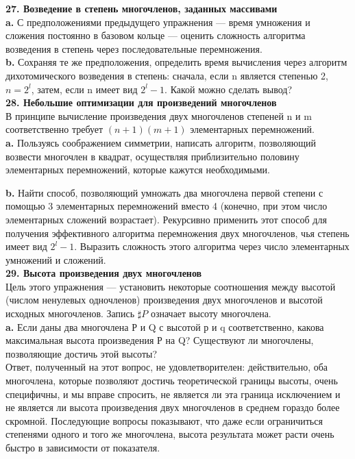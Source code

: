 \noindent
\textbf{27. Возведение в степень многочленов, заданных массивами}\\

\textbf{a.} С предположениями предыдущего упражнения — время умножения и сложения постоянно в базовом кольце — оценить сложность алгоритма возведения в степень через последовательные перемножения.\\

\textbf{b.} Сохраняя те же предположения, определить время вычисления через алгоритм дихотомического возведения в степень: сначала, если n является степенью 2, $n = 2^{l}$, затем, если n имеет вид $2^{l} - 1$. Какой можно сделать вывод?\\

\noindent
\textbf{28. Небольшие оптимизации для произведений многочленов}\\

В принципе вычисление произведения двух многочленов степеней n и m соответственно требует $(n+1)(m+1)$ элементарных перемножений.\\

\textbf{a.} Пользуясь соображением симметрии, написать алгоритм, позволяющий возвести многочлен в квадрат, осуществляя приблизительно половину элементарных перемножений, которые кажутся необходимыми.
\newpage

\textbf{b.} Найти способ, позволяющий умножать два многочлена первой степени с помощью 3 элементарных перемножений вместо 4 (конечно, при этом число элементарных сложений возрастает). Рекурсивно применить этот способ для получения эффективного алгоритма перемножения двух многочленов, чья степень имеет вид $2^{l} - 1$. Выразить сложность этого алгоритма через число элементарных умножений и сложений.\\

\noindent
\textbf{29. Высота произведения двух многочленов}\\

Цель этого упражнения — установить некоторые соотношения между высотой (числом ненулевых одночленов) произведения двух многочленов и высотой исходных многочленов. Запись $\sharp P$ означает высоту многочлена.\\

\textbf{a.} Если даны два многочлена Р и Q с высотой р и q соответственно, какова максимальная высота произведения Р на Q? Существуют ли многочлены, позволяющие достичь этой высоты?\\

Ответ, полученный на этот вопрос, не удовлетворителен: действительно, оба многочлена, которые позволяют достичь теоретической границы высоты, очень специфичны, и мы вправе спросить, не является ли эта граница исключением и не является ли высота произведения двух многочленов в среднем гораздо более скромной. Последующие вопросы показывают, что даже если ограничиться степенями одного и того же многочлена, высота результата может расти очень быстро в зависимости от показателя.\\

